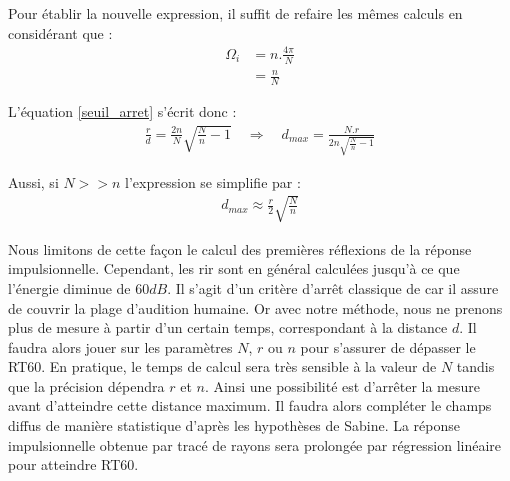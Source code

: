 Pour établir la nouvelle expression, il suffit de refaire les mêmes calculs en considérant que :
\begin{align}
	\Omega_i &= n.\frac{4\pi}{N} \\
	&= \frac{n}{N}
\end{align}

L'équation \ref{seuil_arret} s'écrit donc :
\begin{align} 
	\frac{r}{d} =  \frac{2n}{N} \sqrt{\frac{N}{n}-1} %
 	\quad \Rightarrow  \quad %
	 d_{max} =  \frac{N.r}{2n\sqrt{\frac{N}{n}-1}} 
\end{align}

Aussi, si $N >> n$ l'expression se simplifie par : 
\begin{align} \label{eq_dmax}
	 d_{max} \approx  \frac{r}{2} \sqrt{\frac{N}{n}}
\end{align}

Nous limitons de cette façon le calcul des premières réflexions de la réponse impulsionnelle. Cependant, les \gls{rir} sont en général calculées jusqu'à ce que l'énergie diminue de $60dB$. Il s'agit d'un critère d'arrêt classique de car il assure de couvrir la plage d'audition humaine. Or avec notre méthode, nous ne prenons plus de mesure à partir d'un certain temps, correspondant à la distance $d$. Il faudra alors jouer sur les paramètres $N$, $r$ ou $n$ pour s'assurer de dépasser le \gls{RT60}. En pratique, le temps de calcul sera très sensible à la valeur de $N$ tandis que la précision dépendra $r$ et $n$. Ainsi une possibilité est d'arrêter la mesure avant d'atteindre cette distance maximum. Il faudra alors compléter le champs diffus de manière statistique d'après les hypothèses de Sabine. La réponse impulsionnelle obtenue par tracé de rayons sera prolongée par régression linéaire pour atteindre \gls{RT60}. \\














